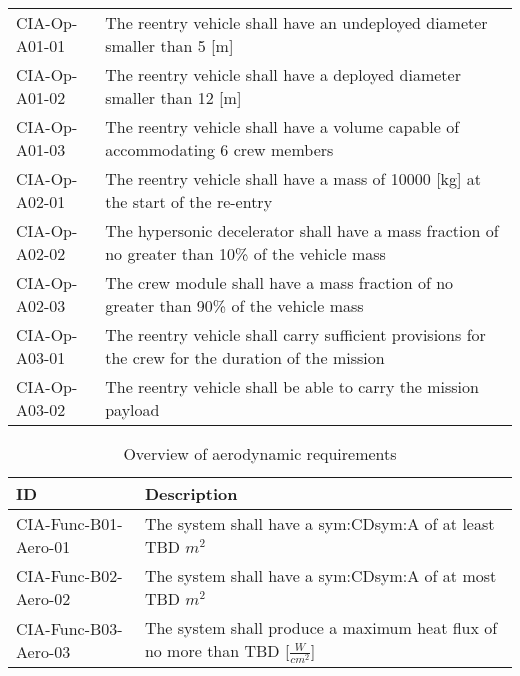 \begin{table}[H]
\begin{tabular}{|p{}|p{}|}
& \\ \hline
	CIA-Op-A01-01 & The reentry vehicle shall have an undeployed diameter smaller than 5 [m]                         				            \\ \hline
	CIA-Op-A01-02 & The reentry vehicle shall have a deployed diameter smaller than 12 [m]                         				            \\ \hline
	CIA-Op-A01-03 & The reentry vehicle shall have a volume capable of accommodating 6 crew members                        				            \\ \hline
	CIA-Op-A02-01 & The reentry vehicle shall have a mass of 10000 [kg] at the start of the re-entry                       				            \\ \hline
	CIA-Op-A02-02 & The hypersonic decelerator shall have a mass fraction of no greater than 10\% of the vehicle mass  \\ \hline
	CIA-Op-A02-03 & The crew module shall have a mass fraction of no greater than 90\% of the vehicle mass \\ \hline
	CIA-Op-A03-01 & The reentry vehicle shall carry sufficient provisions for the crew for the duration of the mission \\ \hline
	CIA-Op-A03-02 & The reentry vehicle shall be able to carry the mission payload								\\ \hline	
    \end{tabular}
\end{table}


\begin{table}[h]
	\caption*{Overview of aerodynamic requirements}
	\begin{tabular}{|p{}|p{}|}
		\hline
		ID & Description \\
		\hline \hline
		CIA-Func-B01-Aero-01 & The system shall have a \gls{sym:CD}\gls{sym:A} of at least TBD $m^{2}$ \\ \hline
		CIA-Func-B02-Aero-02 & The system shall have a \gls{sym:CD}\gls{sym:A} of at most TBD $m^{2}$ \\ \hline
		CIA-Func-B03-Aero-03 & The system shall produce a maximum heat flux of no more than TBD [$\frac{W}{cm^{2}}$] \\ \hline
	\end{tabular}
\end{table}

